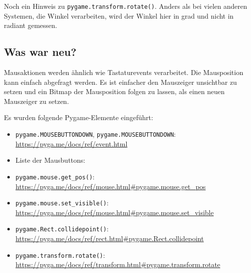 
Noch ein Hinweis zu \texttt{pygame.transform.rotate()}. Anders als bei vielen anderen Systemen, die Winkel verarbeiten, wird der Winkel hier in \gls{grad} und nicht in \gls{radiant} gemessen.


\subsection*{Was war neu?}

Mausaktionen werden ähnlich wie Tastaturevents verarbeitet. Die Mausposition kann einfach abgefragt werden. Es ist einfacher den Mauszeiger unsichtbar zu setzen und ein Bitmap der Mausposition folgen zu lassen, als einen neuen Mauszeiger zu setzen.

Es wurden folgende Pygame-Elemente eingeführt:
\begin{itemize}
	\item \texttt{pygame.MOUSEBUTTONDOWN}, \texttt{pygame.MOUSEBUTTONDOWN}:
	\\ \url{https://pyga.me/docs/ref/event.html}

	\item Liste der Mausbuttons: 
	\item \texttt{pygame.mouse.get\_pos()}:
    \\ \url{https://pyga.me/docs/ref/mouse.html#pygame.mouse.get_pos}

	\item \texttt{pygame.mouse.set\_visible()}:
    \\ \url{https://pyga.me/docs/ref/mouse.html#pygame.mouse.set_visible}

	\item \texttt{pygame.Rect.collidepoint()}:
    \\ \url{https://pyga.me/docs/ref/rect.html#pygame.Rect.collidepoint}

	\item \texttt{pygame.transform.rotate()}:
    \\ \url{https://pyga.me/docs/ref/transform.html#pygame.transform.rotate}

\end{itemize}


